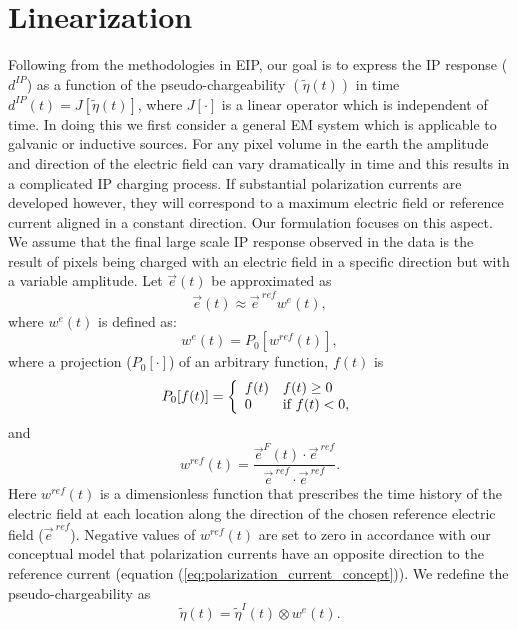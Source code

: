 \documentclass[a4paper, 11pt]{article}
\newcommand {\e}  { {\vec e} }
\newcommand{\peta}{\tilde{\eta}}
\newcommand{\eref}{\e^{\ ref}}
\newcommand{\dip}{d^{IP}}
\begin{document}
\section{Linearization}
Following from the methodologies in EIP, our goal is to express the IP response ($\dip$) as a function of the pseudo-chargeability $(\peta(t))$ in time  $\dip(t) = J[\peta(t)]$, where $J[\cdot]$ is a linear operator which is independent of time. In doing this we first consider a general EM system which is applicable to galvanic or inductive sources. 
For any pixel  volume in the earth the amplitude and direction of the  electric field can vary dramatically  in time and this results in a complicated  IP charging process. If substantial polarization currents are developed however, they will correspond to a maximum electric field or reference current aligned in a constant direction. Our formulation focuses on this aspect. We assume that the final large scale IP response observed in the data is the result of  pixels being charged with an electric field in a specific direction but with a variable amplitude. Let $\e(t)$ be approximated as
\begin{equation}
  \e(t) \approx \eref w^e(t),
  \label{eq: e_with_eref}
\end{equation}
where $w^e(t)$ is defined as:
\begin{equation}
  w^e(t) = P_0[w^{ref}(t)],
  \label{eq: we}
\end{equation}
where a projection ($P_0[\cdot]$) of an arbitrary function, $f(t)$ is
\begin{equation}
  P_0[f(t)] = \left\{ 
  \begin{array}{l l}
    f(t) & f(t) \ge 0 \\
    0 & \text{if } f(t) < 0, 
  \end{array}\right.
  \label{eq: we}
\end{equation}
and
\begin{equation}
  w^{ref}(t) = \frac{\e^F(t)\cdot\eref}{\eref\cdot\eref}.
  \label{eq: wref}
\end{equation}
Here $w^{ref}(t)$ is a dimensionless function that prescribes the time history of the electric field at each location along the direction of the chosen reference electric field ($\eref$).  Negative values of  $w^{ref}(t)$ are set to zero in accordance with our conceptual model that polarization currents have an opposite direction to the reference current (equation (\ref{eq:polarization_current_concept})).
We redefine the pseudo-chargeability as
\begin{equation}
    \peta(t) = \peta^{I}(t)\otimes w^e(t).
    \label{eq: pseudochargeability}
\end{equation}
\end{document}
